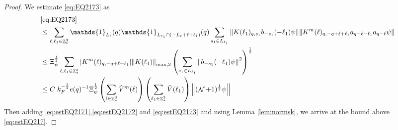 \documentclass[sn-mathphys, Numbered ,a4paper]{sn-jnl}%
\DeclareMathOperator{\Z}{\mathbb{Z}}
\DeclareMathOperator{\NN}{\mathcal{N}}
\newcommand{\half}{\frac{1}{2}}
\theoremstyle{plain}
\theoremstyle{definition}
\theoremstyle{remark}
\theoremstyle{plain}
\theoremstyle{definition}
\theoremstyle{remark}
\begin{document}
\begin{proof}
We estimate \eqref{eq:EQ2173} as
\begin{align}
	&\eqref{eq:EQ2173}\nonumber\\
	&\leq\sum\limits_{\ell, \ell_1\in \Z^3_*} \mathds{1}_{L_{\ell}}(q) \mathds{1}_{L_{\ell_1}\cap (-L_{\ell}+\ell+\ell_1)}(q) \sum\limits_{s_1\in L_{\ell_1}} \norm{ K(\ell_1)_{q,s_1} b_{-s_1}(-\ell_1) \psi}\norm{ K^m(\ell)_{q,-q+\ell+\ell_1} a_{q-\ell-\ell_1} a_{q-\ell} \psi }\nonumber\\
	&\leq \Xi_{\psi}^\half \sum\limits_{\ell, \ell_1\in \Z^3_*} \abs{K^m(\ell)_{q,-q+\ell+\ell_1}} \norm{K(\ell_1)}_{\mathrm{max,2}} \left(\sum\limits_{s_1 \in L_{\ell_1}} \norm{ b_{-s_1}(-\ell_1) \psi}^2\right)^\half  \nonumber\\ 
	&\leq C\; k_F^{-\frac{3}{2}} e(q)^{-1}\Xi_{\psi}^\half \left(\sum\limits_{\ell \in \Z^3_*} \hat{V}^{m}(\ell)\right)\left( \sum\limits_{\ell_1\in \Z^3_*} \hat{V}(\ell_1) \right) \norm{ (\NN+1)^\half \psi } \label{eq:estEQ2173}
\end{align}
Then adding \eqref{eq:estEQ2171},\eqref{eq:estEQ2172} and \eqref{eq:estEQ2173} and using Lemma \ref{lem:normsk}, we arrive at the bound above \eqref{eq:estEQ217}. 
\end{proof}
\end{document}

